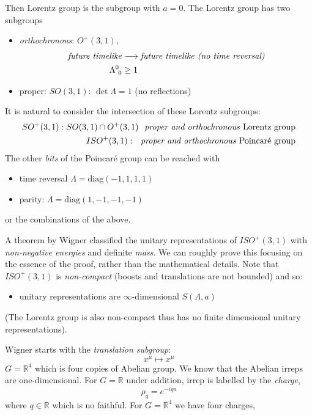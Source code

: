 Then Lorentz group is the subgroup with $a=0$. The Lorentz group has two subgroups
\begin{itemize}
    \item \textit{orthochronous}: $O^{+}(3,1)$,
    \begin{equation}
    \begin{split}
        \text{\textit{future timelike}}&\longrightarrow \text{\textit{future timelike (no time reversal)}}\\
        \Lambda^{0}_{\ 0}&\geq 1
    \end{split}
    \end{equation}
    \item proper: $SO(3,1)$: $\det\Lambda = 1$ (no reflections)
\end{itemize}

It is natural to consider the intersection of these Lorentz subgroups: 
\begin{equation}
    \begin{split}
        SO^+(3,1): SO(3,1)\cap O^{+}(3,1) \text{ \textit{ proper and orthochronous} Lorentz group}\\
        ISO^+(3,1): \text{ \textit{ proper and orthochronous} Poincar\'e group}
    \end{split}
\end{equation}
The other \textit{bits} of the Poincar\'e group can be reached with
\begin{itemize}
    \item time reversal $\Lambda = \text{diag}(-1,1,1,1)$
    \item parity: $\Lambda = \text{diag}(1,-1,-1,-1)$
\end{itemize}
or the combinations of the above.

A theorem by Wigner classified the unitary representations of $ISO^+(3,1)$ with \textit{non-negative energies} and definite \textit{mass}. We can roughly prove this focusing on the essence of the proof, rather than the mathematical details. Note that $ISO^+(3,1)$ is \textit{non-compact} (boosts and translations are not bounded) and so: 
\begin{itemize}
    \item unitary representations are $\infty$-dimensional $S(\Lambda,a)$
\end{itemize}
(The Lorentz group is also non-compact thus has no finite dimensional unitary representations).

Wigner starts with the \textit{translation subgroup}: 
\begin{equation}
    x^{\mu}\mapsto x^{\mu}
\end{equation}
$G = \mathbb{R}^4$ which is four copies of Abelian group. We know that the Abelian irreps are one-dimensional. For $G = \mathbb{R}$ under addition, irrep is labelled by the \textit{charge}, 
\begin{equation}
    \rho_{q} = e^{-iqa}
\end{equation}
where $q\in\mathbb{R}$ which is no faithful. For $G = \mathbb{R}^4$ we have four charges, 

